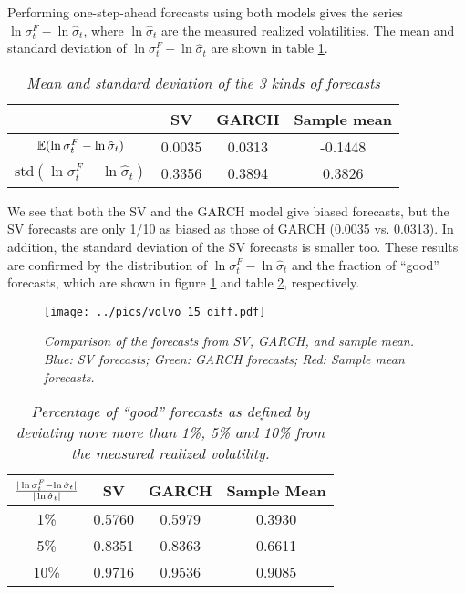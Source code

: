 Performing one-step-ahead forecasts using both models gives the series
$\ln\sigma^F_t - \ln\hat{\sigma}_t$, where $\ln\hat{\sigma}_t$ are the
measured realized volatilities. The mean and standard deviation of
$\ln\sigma^F_t - \ln\hat{\sigma}_t$ are shown in table
\ref{tab:volvo_15_stat}.
\begin{table}[htb!]
  \centering
  \begin{tabular}{|c|c|c|c|}
    \hline
     & SV & GARCH & Sample mean \\
     \hline
    $\mathbb{E}(\ln \sigma^F_t - \ln \hat{\sigma}_t)$ & 0.0035 & 0.0313 & -0.1448 \\
    \hline
     $\text{std}(\ln \sigma^F_t - \ln \hat{\sigma}_t)$ & 0.3356 &
     0.3894 & 0.3826 \\
    \hline
 \end{tabular}
  \caption{\small \it Mean and standard deviation of the 3 kinds of
    forecasts}
  \label{tab:volvo_15_stat}
\end{table}
We see that both the SV and the GARCH model give biased forecasts, but
the SV forecasts are only 1/10 as biased as those of GARCH (0.0035
vs. 0.0313). In addition, the standard deviation of the SV forecasts
is smaller too. These results are confirmed by the distribution of
$\ln \sigma^F_t - \ln \hat{\sigma}_t$ and the fraction of ``good''
forecasts, which are shown in figure \ref{fig:volvo_15_diff} and table
\ref{tab:volvo_15_diff}, respectively.
\begin{figure}[htb!]
  \centering
    \texttt{[image: ../pics/volvo\_15\_diff.pdf]}
  \caption{\small \it Comparison of the forecasts from SV, GARCH,
    and sample mean. Blue: SV forecasts; Green: GARCH forecasts; Red:
    Sample mean forecasts.}
  \label{fig:volvo_15_diff}
\end{figure}
\begin{table}[htb!]
  \centering
  \begin{tabular}{|c|c|c|c|}
    \hline
    ${|\ln \sigma^F_t - \ln \hat{\sigma}_t| \over |\ln
      \hat{\sigma}_t|}$ &
    SV & GARCH & Sample Mean \\
    \hline
    1\% & 0.5760 & 0.5979 & 0.3930 \\
    \hline
    5\% & 0.8351 & 0.8363 & 0.6611 \\
    \hline
    10\% & 0.9716 & 0.9536 & 0.9085 \\
    \hline
  \end{tabular}
  \caption{\small \it Percentage of ``good'' forecasts as defined by
    deviating nore more than 1\%, 5\% and 10\% from the measured
    realized volatility.}
  \label{tab:volvo_15_diff}
\end{table}

